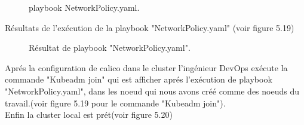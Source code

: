 {\begin{figure}[H]
\begin{center}
        \end{center}
        \caption{playbook NetworkPolicy.yaml.}
       \end{figure}
       \indent\indent Résultats de l'exécution de la playbook "NetworkPolicy.yaml" (voir figure 5.19)
       \begin{figure}[H]
           \begin{center}
           \end{center}
           \caption{Résultat de playbook "NetworkPolicy.yaml".}
          \end{figure} 
           Aprés la configuration de calico dans le cluster l'ingénieur DevOps exécute la commande "Kubeadm join" qui est afficher aprés l'exécution de playbook "NetworkPolicy.yaml", dans les noeud qui nous avons créé comme des noeuds du travail.(voir figure 5.19 pour le commande "Kubeadm join").\\Enfin la cluster local est prét(voir figure 5.20)
        \begin{figure}[H]
         \begin{center}

\end{center}
\end{figure}}
